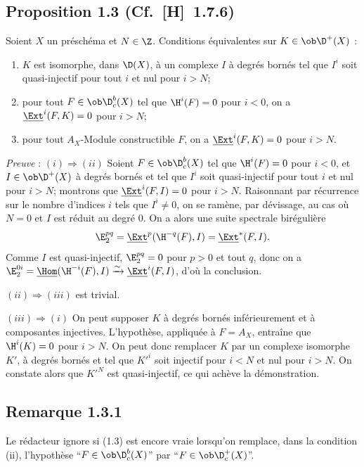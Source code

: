 \subsection*{Proposition 1.3 {\normalfont (Cf.~[H]~1.7.6)}}
Soient $X$ un préschéma et $N \in \Z$. Conditions équivalentes sur $K \in \ob \D^{+}(X)$ :
\begin{enumerate}[label=(\roman*)]
\item $K$ est isomorphe, dans $\D(X)$, à un complexe $I$ à degrés bornés tel que $I^i$ soit quasi-injectif pour tout $i$ et nul pour $i > N$;
\item pour tout $F \in \ob \D_c^{b}(X)$ tel que $\H^i(F) = 0$ pour $i < 0$, on a $\underline{\Ext}^i(F,K) = 0$ pour $i > N$;
\item pour tout $A_X$-Module constructible $F$, on a $\underline{\Ext}^i(F,K) = 0$ pour $i > N$.
\end{enumerate}

\emph{Preuve} : $(i) \Rightarrow (ii)$ Soient $F \in \ob \D_c^{b}(X)$ tel que $\H^i(F) = 0$ pour $i < 0$, et $I \in \ob \D^{+}(X)$ à degrés bornés et tel que $I^i$ soit quasi-injectif pour tout $i$ et nul pour $i > N$; montrons que $\underline{\Ext}^i(F,I) = 0$ pour $i > N$. Raisonnant par récurrence sur le nombre d'indices $i$ tels que $I^i \neq 0$, on se ramène, par dévissage, au cas où $N = 0$ et $I$ est réduit au degré $0$. On a alors une suite spectrale birégulière
\[
\E_2^{pq} = \underline{\Ext}^p(\H^{-q}(F),I) = \underline{\Ext}^{*}(F,I).
\]
Comme $I$ est quasi-injectif, $\E_2^{pq} = 0$ pour $p > 0$ et tout $q$, donc on a $\E_2^{0i} = \underline{\Hom}(\H^{-i}(F),I) \xrightarrow{\sim} \underline{\Ext}^i(F,I)$, d'où la conclusion.

$(ii) \Rightarrow (iii)$ est trivial.

$(iii) \Rightarrow (i)$ On peut supposer $K$ à degrés bornés inférieurement et à
composantes injectives. L'hypothèse, appliquée à $F = A_X$, entraîne que $\H^i(K) = 0$ pour $i > N$. On peut donc remplacer $K$ par un complexe isomorphe $K'$, à degrés bornés et tel que $K'^i$ soit injectif pour $i < N$ et nul pour $i > N$. On constate alors que $K'^N$ est quasi-injectif, ce qui achève la démonstration.

\subsection*{Remarque 1.3.1}
Le rédacteur ignore si (1.3) est encore vraie lorsqu'on remplace, dans la condition (ii), l'hypothèse ``$F \in \ob \D_c^{b}(X)$'' par ``$F \in \ob \D_c^{+}(X)$''.

